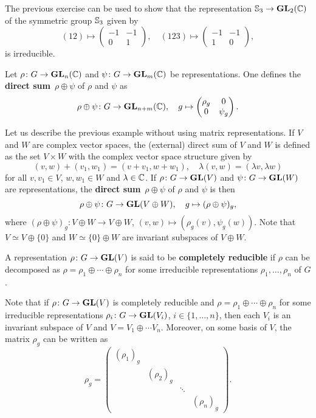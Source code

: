The previous exercise can be used to show that the representation
$\mathbb{S}_3\to\mathbf{GL}_2(\mathbb{C})$
of the symmetric group $\mathbb{S}_3$
given by
\[
(12)\mapsto\begin{pmatrix}
-1&-1\\0&1
\end{pmatrix},
\quad
(123)\mapsto\begin{pmatrix}
-1&-1\\
1&0
\end{pmatrix},
\]
is irreducible.

\begin{example}
Let $\rho\colon G\to\mathbf{GL}_n(\mathbb{C})$ and $\psi\colon G\to\mathbf{GL}_m(\mathbb{C})$ be representations. One defines
the \textbf{direct sum} $\rho\oplus\psi$ of $\rho$ and $\psi$ as 
\[
\rho\oplus\psi\colon G\to\mathbf{GL}_{n+m}(\mathbb{C}),\quad
g\mapsto 
\begin{pmatrix}
\rho_g & 0\\
0 & \psi_g	
\end{pmatrix}.
\]
\end{example}

Let us describe the previous example without using matrix representations. If $V$ and 
$W$ are complex vector spaces, the (external) direct sum of $V$ and $W$ is defined
as the set $V\times W$ with the complex vector space structure given by
\[
(v,w)+(v_1,w_1)=(v+v_1,w+w_1),\quad
\lambda (v,w)=(\lambda v,\lambda w)
\]
for all $v,v_1\in V$, $w,w_1\in W$ and $\lambda\in\mathbb{C}$. 
If $\rho\colon G\to\mathbf{GL}(V)$ and $\psi\colon G\to\mathbf{GL}(W)$ are representations, 
the \textbf{direct sum} $\rho\oplus\psi$ of $\rho$ and $\psi$ is then 
\[
\rho\oplus\psi\colon G\to\mathbf{GL}(V\oplus W),\quad
g\mapsto (\rho\oplus\psi)_g,
\]
where $(\rho\oplus\psi)_g\colon V\oplus W\to V\oplus W$, 
$(v,w)\mapsto (\rho_g(v),\psi_g(w))$. Note that
$V\simeq V\oplus\{0\}$ and $W\simeq \{0\}\oplus W$ are
invariant subspaces of $V\oplus W$. 

\begin{definition}
    A representation $\rho\colon G\to\mathbf{GL}(V)$ is said to be 
    \textbf{completely reducible}
    if $\rho$ can be decomposed as
    $\rho=\rho_1\oplus\cdots\oplus \rho_n$ for some irreducible
    representations $\rho_1,\dots,\rho_n$ of $G$. 
\end{definition}

Note that if $\rho\colon G\to\mathbf{GL}(V)$ is completely reducible and 
$\rho=\rho_1\oplus\cdots\oplus \rho_n$ for some irreducible representations 
$\rho_i\colon G\to\mathbf{GL}(V_i)$, $i\in\{1,\dots,n\}$, then 
each $V_i$ is an invariant subspace of $V$ and $V=V_1\oplus \cdots V_n$. 
Moreover, on some basis of $V$, the matrix  
$\rho_g$ can be written as 
\[
\rho_g=\begin{pmatrix}
(\rho_1)_g &  \\
& (\rho_2)_g  \\
&&\ddots\\
&&&(\rho_n)_g	
\end{pmatrix}.
\]

